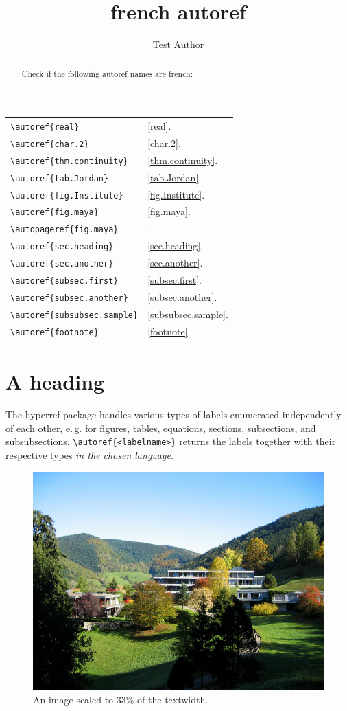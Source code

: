 \documentclass{snapshotmfo}
\author{Test Author}
\title{french autoref}
\begin{document}
\begin{abstract}
Check if the following autoref names are french:
\end{abstract}

\noindent\begin{tabular}{@{}l@{\quad yields\quad}l@{}}
\verb+\autoref{real}+             &\autoref{real}.\\
\verb+\autoref{char.2}+           &\autoref{char.2}.\\
\verb+\autoref{thm.continuity}+   &\autoref{thm.continuity}.\\
\verb+\autoref{tab.Jordan}+       &\autoref{tab.Jordan}.\\
\verb+\autoref{fig.Institute}+    &\autoref{fig.Institute}.\\
\verb+\autoref{fig.maya}+         &\autoref{fig.maya}.\\
\verb+\autopageref{fig.maya}+     &\autopageref{fig.maya}.\\
\verb+\autoref{sec.heading}+      &\autoref{sec.heading}.\\
\verb+\autoref{sec.another}+      &\autoref{sec.another}.\\
\verb+\autoref{subsec.first}+     &\autoref{subsec.first}.\\
\verb+\autoref{subsec.another}+   &\autoref{subsec.another}.\\
\verb+\autoref{subsubsec.sample}+ &\autoref{subsubsec.sample}.\\
\verb+\autoref{footnote}+         &\autoref{footnote}.\\
\end{tabular}


\section{A heading}
\label{sec.heading}
The hyperref package handles various types of labels enumerated independently of each other, e.\,g.
for figures, tables, equations, sections, subsections, and subsubsections.
\verb+\autoref{<labelname>}+ returns the labels together with their respective types {\em in the chosen language}.

\begin{figure}[ht]
        \centering
        \includegraphics[width= 0.33 \textwidth]{mfo.jpg}
        \caption{An image scaled to 33\% of the textwidth.}
\label{fig.Institute}
\end{figure}
\end{document}
